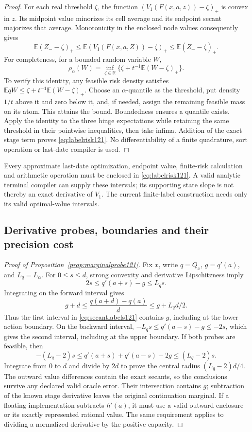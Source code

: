 \begin{proof}
For each real threshold \(\zeta\), the function
\((V_1(F(x,a,z))-\zeta)_+\) is convex in \(z\).
Its midpoint value minorizes its cell average and its endpoint
secant majorizes that average.  Monotonicity in the enclosed
node values consequently gives
\[
 \mathbb E(Z_--\zeta)_+
 \leq\mathbb E(V_1(F(x,a,Z))-\zeta)_+
 \leq\mathbb E(Z_+-\zeta)_+ .
\]
For completeness, for a bounded random variable \(W\),
\[
 \rho_\alpha(W)=
 \inf_{\zeta\in\mathbb R}
       \{\zeta+t^{-1}\mathbb E(W-\zeta)_+\}.
\]
To verify this identity, any feasible risk density satisfies
\(\mathbb E qW\leq\zeta+t^{-1}\mathbb E(W-\zeta)_+\).
Choose an \(\alpha\)-quantile as the threshold, put density
\(1/t\) above it and zero below it, and, if needed, assign
the remaining feasible mass on its atom.  This attains the
bound.  Boundedness ensures a quantile exists.
Apply the identity to the three hinge expectations while
retaining the same threshold in their pointwise inequalities,
then take infima.  Addition of the exact stage term proves
\eqref{eq:labelrisk121}.  No differentiability of a finite
quadrature, sort operation or last-date compiler is used.
\end{proof}

Every approximate last-date optimization, endpoint value,
finite-risk calculation and arithmetic operation must be
enclosed in \eqref{eq:labelrisk121}.  A valid analytic terminal
compiler can supply these intervals; its supporting state
slope is not thereby an exact derivative of \(V_1\).
The current finite-label construction needs only its valid
optimal-value intervals.

\subsection{Derivative probes, boundaries and their precision cost}

\begin{proof}[Proof of Proposition~\ref{prop:marginalprobe121}]
Fix \(x\), write \(q=Q_x\), \(g=q'(a)\), and
\(L_q=L_\alpha\).
For \(0\leq s\leq d\), strong convexity and derivative
Lipschitzness imply
\[
 2s\leq q'(a+s)-g\leq L_qs.
\]
Integrating on the forward interval gives
\[
 g+d\leq \frac{q(a+d)-q(a)}d
                         \leq g+L_qd/2.
\]
Thus the first interval in \eqref{eq:secantlabels121}
contains \(g\), including at the lower action boundary.
On the backward interval,
\(-L_qs\leq q'(a-s)-g\leq-2s\), which gives the second
interval, including at the upper boundary.
If both probes are feasible, then
\[
 -(L_q-2)s
 \leq q'(a+s)+q'(a-s)-2g
 \leq(L_q-2)s.
\]
Integrate from 0 to \(d\) and divide by \(2d\) to prove
the central radius \((L_q-2)d/4\).
The outward value differences contain the exact secants, so
the conclusions survive any declared valid oracle error.
Their intersection contains \(g\); subtraction of the known
stage derivative leaves the original continuation marginal.
If a floating implementation subtracts \(h'(a)\), it must
use a valid outward enclosure or its exactly represented
rational value.  The same requirement applies to dividing a
normalized derivative by the positive capacity.
\end{proof}

